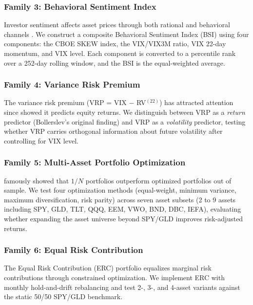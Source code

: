 \documentclass[12pt,a4paper]{article}
\begin{document}
\subsubsection{Family 3: Behavioral Sentiment Index}

Investor sentiment affects asset prices through both rational and behavioral channels \citep{baker2006}. We construct a composite Behavioral Sentiment Index (BSI) using four components: the CBOE SKEW index, the VIX/VIX3M ratio, VIX 22-day momentum, and VIX level. Each component is converted to a percentile rank over a 252-day rolling window, and the BSI is the equal-weighted average.

\subsubsection{Family 4: Variance Risk Premium}

The variance risk premium (VRP = VIX $-$ RV$^{(22)}$) has attracted attention since \citet{bollerslev2009} showed it predicts equity returns. We distinguish between VRP as a \emph{return} predictor (Bollerslev's original finding) and VRP as a \emph{volatility} predictor, testing whether VRP carries orthogonal information about future volatility after controlling for VIX level.

\subsubsection{Family 5: Multi-Asset Portfolio Optimization}

\citet{demiguel2009} famously showed that $1/N$ portfolios outperform optimized portfolios out of sample. We test four optimization methods (equal-weight, minimum variance, maximum diversification, risk parity) across seven asset subsets (2 to 9 assets including SPY, GLD, TLT, QQQ, EEM, VWO, BND, DBC, IEFA), evaluating whether expanding the asset universe beyond SPY/GLD improves risk-adjusted returns.

\subsubsection{Family 6: Equal Risk Contribution}

The Equal Risk Contribution (ERC) portfolio \citep{maillard2010} equalizes marginal risk contributions through constrained optimization. We implement ERC with monthly hold-and-drift rebalancing and test 2-, 3-, and 4-asset variants against the static 50/50 SPY/GLD benchmark.
\end{document}
